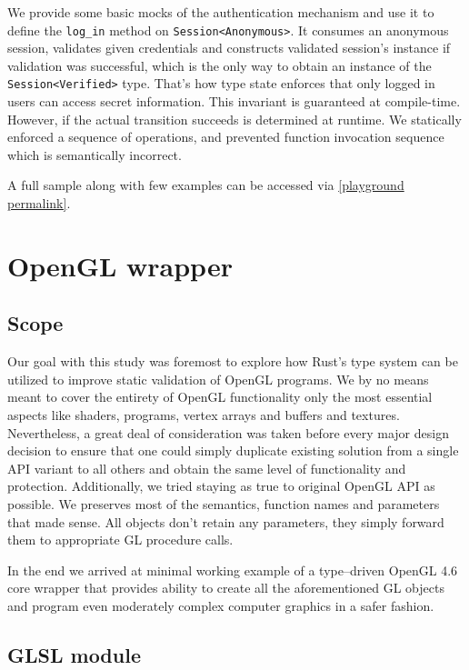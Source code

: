We provide some basic mocks of the authentication mechanism and use it to define the \texttt{log\_in} method on \texttt{Session<Anonymous>}.
It consumes an anonymous session, validates given credentials and constructs validated session's instance if validation was successful,
which is the only way to obtain an instance of the \texttt{Session<Verified>} type.
That's how type state enforces that only logged in users can access secret information. This invariant is guaranteed at compile-time.
However, if the actual transition succeeds is determined at runtime. We statically enforced a sequence of operations, and prevented
function invocation sequence which is semantically incorrect.

A full sample along with few examples can be accessed via \noindent \href{https://play.rust-lang.org/?version=stable&mode=debug&edition=2021&gist=bb0ff57d61dcdc9f4473cf51bec012a3}{[playground permalink]}.

\section{OpenGL wrapper}
  
\subsection*{Scope}

Our goal with this study was foremost to explore how Rust's type system can be utilized to improve static validation of OpenGL programs.
We by no means meant to cover the entirety of OpenGL functionality only the most essential aspects like shaders, programs, vertex arrays and buffers and textures.
Nevertheless, a great deal of consideration was taken before every major design decision to ensure that one could simply duplicate existing solution from a single 
API variant to all others and obtain the same level of functionality and protection.
Additionally, we tried staying as true to original OpenGL API as possible. We preserves most of the semantics, function names and parameters that made sense.
All objects don't retain any parameters, they simply forward them to appropriate GL procedure calls. 

In the end we arrived at minimal working example of a type--driven OpenGL 4.6 core wrapper that provides ability to create all the aforementioned GL objects
and program even moderately complex computer graphics in a safer fashion.

\subsection{GLSL module}

